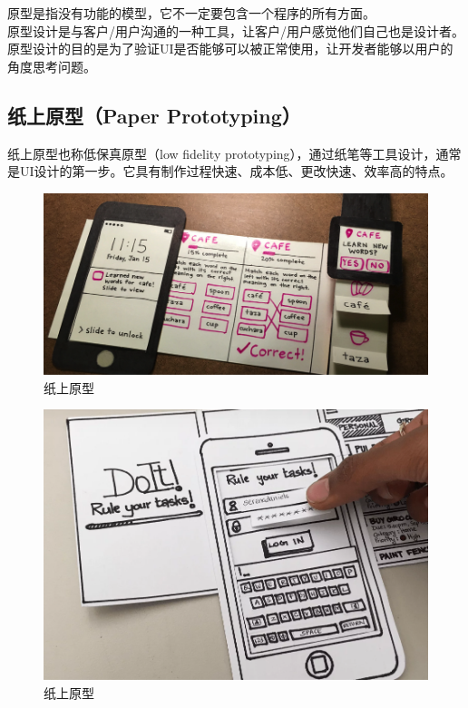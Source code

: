 原型是指没有功能的模型，它不一定要包含一个程序的所有方面。\\

原型设计是与客户/用户沟通的一种工具，让客户/用户感觉他们自己也是设计者。原型设计的目的是为了验证UI是否能够可以被正常使用，让开发者能够以用户的角度思考问题。\\

\subsection{纸上原型（Paper Prototyping）}

纸上原型也称低保真原型（low fidelity prototyping），通过纸笔等工具设计，通常是UI设计的第一步。它具有制作过程快速、成本低、更改快速、效率高的特点。\\

\begin{figure}[H]
    \centering
    \includegraphics[scale=0.5]{img/Chapter1/1-3/1.png}
    \caption{纸上原型}
\end{figure}

\begin{figure}[H]
    \centering
    \includegraphics[scale=0.7]{img/Chapter1/1-3/2.png}
    \caption{纸上原型}
\end{figure}

